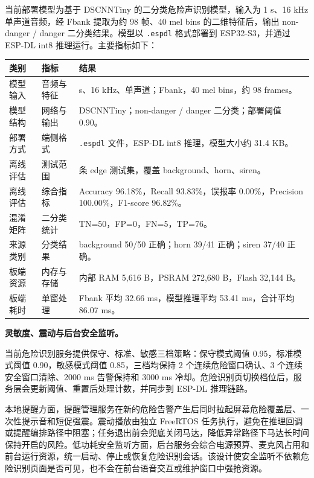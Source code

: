 \documentclass[UTF8,a4paper,12pt]{ctexart}
\begin{document}
当前部署模型为基于 DSCNNTiny 的二分类危险声识别模型，输入为 1 s、16 kHz 单声道音频，经 Fbank 提取为约 98 帧、40 mel bins 的二维特征后，输出 non-danger / danger 二分类结果。模型以 \texttt{.espdl} 格式部署到 ESP32-S3，并通过 ESP-DL int8 推理运行。主要指标如下：

{\small
\setlength{\tabcolsep}{4pt}
\noindent\begin{longtable}{p{3.0cm}>{\RaggedRight\arraybackslash}p{4.0cm}>{\RaggedRight\arraybackslash}p{6.0cm}}
\toprule
类别 & 指标 & 结果 \\
\midrule
模型输入 & 音频与特征 & 1 s、16 kHz、单声道；Fbank，40 mel bins，约 98 frames。 \\
模型结构 & 网络与输出 & DSCNNTiny；non-danger / danger 二分类；部署阈值 0.90。 \\
部署方式 & 端侧格式 & \texttt{.espdl} 文件，ESP-DL int8 推理，模型大小约 31.4 KB。 \\
离线评估 & 测试范围 & 131 条 edge 测试集，覆盖 background、horn、siren。 \\
离线评估 & 综合指标 & Accuracy 96.18\%，Recall 93.83\%，误报率 0.00\%，Precision 100.00\%，F1-score 96.82\%。 \\
混淆矩阵 & 二分类统计 & TN=50，FP=0，FN=5，TP=76。 \\
来源类别 & 分类结果 & background 50/50 正确；horn 39/41 正确；siren 37/40 正确。 \\
板端资源 & 内存与存储 & 内部 RAM 5,616 B，PSRAM 272,680 B，Flash 32,144 B。 \\
板端耗时 & 单窗处理 & Fbank 平均 32.66 ms，模型推理平均 53.41 ms，合计平均 86.07 ms。 \\
\bottomrule
\end{longtable}
}

\noindent\textbf{灵敏度、震动与后台安全监听。}

当前危险识别服务提供保守、标准、敏感三档策略：保守模式阈值 0.95，标准模式阈值 0.90，敏感模式阈值 0.85，三档均保持 2 个连续危险窗口确认、3 个连续安全窗口清除、2000 ms 告警保持和 3000 ms 冷却。危险识别页切换档位后，服务层会更新阈值、重置后处理计数，并同步到 ESP-DL 推理链路。

本地提醒方面，提醒管理服务在新的危险告警产生后同时拉起屏幕危险覆盖层、一次性提示音和短促强震。震动播放由独立 FreeRTOS 任务执行，避免在推理回调或提醒编排路径中阻塞；任务退出前会兜底关闭马达，降低异常路径下马达长时间保持开启的风险。低功耗安全监听方面，后台服务会综合电源预算、麦克风占用和前台运行资源，统一启动、停止或恢复危险识别会话。该设计使安全监听不依赖危险识别页面是否可见，也不会在前台语音交互或维护窗口中强抢资源。
\end{document}
